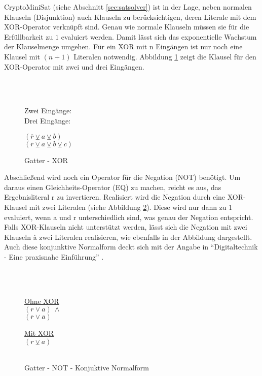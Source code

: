 CryptoMiniSat (siehe Abschnitt \ref{sec:satsolver}) ist in der Lage, neben normalen Klauseln (Disjunktion) auch Klauseln zu berücksichtigen, deren Literale
mit dem XOR-Operator verknüpft sind. Genau wie normale Klauseln müssen sie für die Erfüllbarkeit zu $1$ evaluiert werden. Damit lässt sich das exponentielle
Wachstum der Klauselmenge umgehen. Für ein XOR mit n Eingängen ist nur noch eine Klausel mit $ (n + 1) $ Literalen notwendig. Abbildung \ref{fig:gatter_cnf_xor}
zeigt die Klausel für den XOR-Operator mit zwei und drei Eingängen.
\begin{figure}[!h]
  \centering
  \begin{minipage}[l]{1cm}
    ~\\
    ~
  \end{minipage}
  \begin{minipage}[l]{2.5cm}
    Zwei Eingänge:\\
    Drei Eingänge:
  \end{minipage}
  \begin{minipage}[l]{3cm}
    $ (\overline{r} \veebar a \veebar b) $\\
    $ (\overline{r} \veebar a \veebar b \veebar c) $
  \end{minipage}
  \caption{Gatter - XOR}
  \label{fig:gatter_cnf_xor}
\end{figure}

Abschließend wird noch ein Operator für die Negation (NOT) benötigt. Um daraus einen Gleichheits-Operator (EQ) zu machen, reicht es aus, das Ergebnisliteral r zu invertieren.
Realisiert wird die Negation durch eine XOR-Klausel mit zwei Literalen (siehe Abbildung \ref{fig:gatter_not_cnf}). Diese wird nur dann zu $1$ evaluiert, wenn
a und r unterschiedlich sind, was genau der Negation entspricht. Falls XOR-Klauseln nicht unterstützt werden, lässt sich die Negation mit zwei Klauseln à zwei
Literalen realisieren, wie ebenfalls in der Abbildung dargestellt. Auch diese konjunktive Normalform deckt sich mit der Angabe in
"`Digitaltechnik - Eine praxisnahe Einführung"' \cite[164]{digitaltechnik}.
\begin{figure}[!h]
  \centering
  \begin{minipage}[l]{1cm}
    ~\\
    ~
  \end{minipage}
  \begin{minipage}[l]{2.5cm}
    \underline{Ohne XOR}\\
    $ (r \vee a) ~ \wedge $\\
    $ (\overline{r} \vee \overline{a}) $
  \end{minipage}
  \begin{minipage}[l]{2.5cm}
    \underline{Mit XOR}\\
    $ (r \veebar a) $\\
    ~
  \end{minipage}
  \caption{Gatter - NOT - Konjuktive Normalform}
  \label{fig:gatter_not_cnf}
\end{figure}